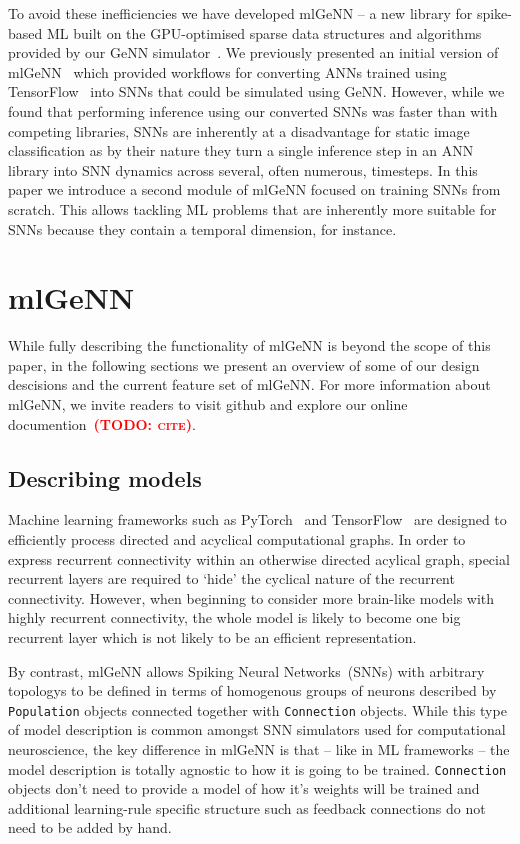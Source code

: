 \documentclass[sigconf]{acmart}
\newcommand{\todo}[1]{\textbf{\textsc{\textcolor{red}{(TODO: #1)}}}}
\begin{document}
To avoid these inefficiencies we have developed mlGeNN -- a new library for spike-based ML built on the GPU-optimised sparse data structures and algorithms provided by our GeNN simulator~\citep{Yavuz2016,Knight2018,Knight2021}.
We previously presented an initial version of mlGeNN~\citep{Turner2022} which provided workflows for converting ANNs trained using TensorFlow~\citep{TensorFlow} into SNNs that could be simulated using GeNN.
However, while we found that performing inference using our converted SNNs was faster than with competing libraries, SNNs are inherently at a disadvantage for static image classification as by their nature they turn a single inference step in an ANN library into SNN dynamics across several, often numerous, timesteps.
In this paper we introduce a second module of mlGeNN focused on training SNNs from scratch. This allows tackling ML problems that are inherently more suitable for SNNs because they contain a temporal dimension, for instance.

\section{mlGeNN}
While fully describing the functionality of mlGeNN is beyond the scope of this paper, in the following sections we present an overview of some of our design descisions and the current feature set of mlGeNN.
For more information about mlGeNN, we invite readers to visit github and explore our online documention~\todo{cite}.

\subsection{Describing models}
Machine learning frameworks such as PyTorch~\citep{paszke2019pytorch} and TensorFlow~\citep{TensorFlow} are designed to efficiently process directed and acyclical computational graphs.
In order to express recurrent connectivity within an otherwise directed acylical graph, special recurrent layers are required to `hide' the cyclical nature of the recurrent connectivity.
However, when beginning to consider more brain-like models with highly recurrent connectivity, the whole model is likely to become one big recurrent layer which is not likely to be an efficient representation.

By contrast, mlGeNN allows Spiking Neural Networks~(SNNs) with arbitrary topologys to be defined in terms of homogenous groups of neurons described by \lstinline{Population} objects connected together with \lstinline{Connection} objects.
While this type of model description is common amongst SNN simulators used for computational neuroscience, the key difference in mlGeNN is that -- like in ML frameworks -- the model description is totally agnostic to how it is going to be trained.
\lstinline{Connection} objects don't need to provide a model of how it's weights will be trained and additional learning-rule specific structure such as feedback connections do not need to be added by hand.
\end{document}
